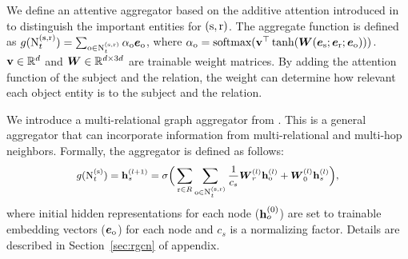 We define an attentive aggregator based on the additive attention introduced in \citep{Bahdanau2015NeuralMT} to distinguish the important entities for $(\mathrm{s},\mathrm{r})$. 
The aggregate function is defined as {\small $g(\text{N}_t^{(\mathrm{s},\mathrm{r})}) = \sum_{\mathrm{o} \in \text{N}_t^{(\mathrm{s}, \mathrm{r})}} \alpha_{\mathrm{o}} \boldsymbol{e}_{\mathrm{o}}$},
where {\small $\alpha_{\mathrm{o}} = \textrm{softmax}(\mathbf{v}^\top \tanh(\boldsymbol{W}(\boldsymbol{e}_{\mathrm{s}}; \boldsymbol{e}_{\mathrm{r}}; \boldsymbol{e}_{\mathrm{o}})))$}.
{\small  $\mathbf{v} \in \mathbb{R}^d$} and  {\small $\boldsymbol{W} \in \mathbb{R}^{d \times 3d}$} are trainable weight matrices. 
By adding the attention function of the subject and the relation, the weight can determine how relevant each object entity is to the subject and the relation.


We introduce a multi-relational graph aggregator from \citep{Schlichtkrull2018ModelingRD}. 
This is a general aggregator that can incorporate information from multi-relational and multi-hop neighbors. Formally, the aggregator is defined as follows:
\begin{equation}
\label{eq:rgcn}
    \small g(\text{N}^{(\mathrm{s})}_t)= \mathbf{h}_s^{(l+1)} = \sigma\Big(\sum_{\mathrm{r}\in R}\sum_{\mathrm{o} \in \text{N}_t^{(\mathrm{s},\mathrm{r})}} \frac{1}{c_s} \boldsymbol{W}_r^{(l)} \mathbf{h}_{\mathrm{o}}^{(l)} + \boldsymbol{W}_0^{(l)} \mathbf{h}_s^{(l)}\Big), 
\end{equation}
where initial hidden representations for each node ($\mathbf{h}_o^{(0)}$) are set to trainable embedding vectors ($\boldsymbol{e}_{\mathrm{o}}$) for each node and $c_s$ is a normalizing factor.
Details are described in Section~\ref{sec:rgcn} of appendix.


